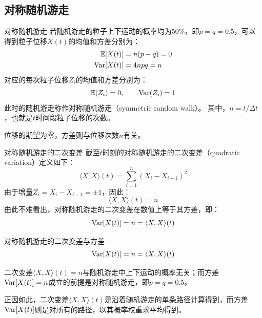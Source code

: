 \documentclass[t]{beamer}
\newcommand{\E}{\mathbb{E}}
\newcommand{\Var}{{\rm Var}}
\begin{document}
\subsection{对称随机游走}
\begin{frame}{对称随机游走}
  若随机游走的粒子上下运动的概率均为50\%，即$p=q=0.5$，可以得到粒子位移$X(t)$的均值和方差分别为：
  \begin{equation*}
  \begin{split}
  \E[X(t)]&=n(p-q) = 0\\
  \Var[X(t)]&=4npq=n
  \end{split}
  \end{equation*}
  对应的每次粒子位移$Z_i$的均值和方差分别为：
  \begin{equation*}
  \E(Z_i)=0,\qquad \Var(Z_i)=1
  \end{equation*}
  此时的随机游走称作对称随机游走（symmetric random walk）。
其中，$n=t/\Delta t$，也就是$t$时间段粒子位移的次数。

\begin{block}{}\centering
  位移的期望为零，方差则与位移次数$n$有关。
\end{block}
\end{frame}

\begin{frame}{对称随机游走的二次变差}
  截至$t$时刻的对称随机游走的二次变差（quadratic variation）定义如下：
  \begin{equation*}
  \langle X,X\rangle(t) =\sum^{n}_{i=1}(X_i-X_{i-1})^2
  \end{equation*}
  由于增量$Z_i=X_i-X_{i-1}=\pm 1$，因此：
  \begin{equation*}
  \langle X,X\rangle(t) =n
  \end{equation*}
  由此不难看出，对称随机游走的二次变差在数值上等于其方差，即：
  \begin{equation*}
  \Var[X(t)]=n=\langle X,X\rangle(t)
  \end{equation*}
\end{frame}


\begin{frame}{对称随机游走的二次变差与方差}
  \begin{equation*}
    \Var[X(t)]=n=\langle X,X\rangle(t)
    \end{equation*}

    二次变差$\langle X,X\rangle(t)=n$与随机游走中上下运动的概率无关；而方差$\Var[X(t)]=n$成立的前提是对称随机游走，即$p=q=0.5$。
    
    正因如此，二次变差$\langle X,X\rangle(t)$是沿着随机游走的单条路径计算得到，而方差$\Var[X(t)]$则是对所有的路径，以其概率权重求平均得到。
\end{frame}
\end{document}
